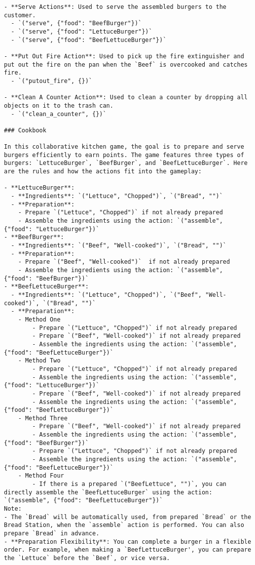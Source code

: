 \begin{lstlisting}
- **Serve Actions**: Used to serve the assembled burgers to the customer.
  - `("serve", {"food": "BeefBurger"})`
  - `("serve", {"food": "LettuceBurger"})`
  - `("serve", {"food": "BeefLettuceBurger"})`

- **Put Out Fire Action**: Used to pick up the fire extinguisher and put out the fire on the pan when the `Beef` is overcooked and catches fire.
  - `("putout_fire", {})`

- **Clean A Counter Action**: Used to clean a counter by dropping all objects on it to the trash can.
  - `("clean_a_counter", {})`

### Cookbook

In this collaborative kitchen game, the goal is to prepare and serve burgers efficiently to earn points. The game features three types of burgers: `LettuceBurger`, `BeefBurger`, and `BeefLettuceBurger`. Here are the rules and how the actions fit into the gameplay:

- **LettuceBurger**:
  - **Ingredients**: `("Lettuce", "Chopped")`, `("Bread", "")`
  - **Preparation**:
    - Prepare `("Lettuce", "Chopped")` if not already prepared
    - Assemble the ingredients using the action: `("assemble", {"food": "LettuceBurger"})`
- **BeefBurger**:
  - **Ingredients**: `("Beef", "Well-cooked")`, `("Bread", "")`
  - **Preparation**:
    - Prepare `("Beef", "Well-cooked")`  if not already prepared
    - Assemble the ingredients using the action: `("assemble", {"food": "BeefBurger"})`
- **BeefLettuceBurger**:
  - **Ingredients**: `("Lettuce", "Chopped")`, `("Beef", "Well-cooked")`, `("Bread", "")`
  - **Preparation**:
    - Method One
        - Prepare `("Lettuce", "Chopped")` if not already prepared
        - Prepare `("Beef", "Well-cooked")` if not already prepared
        - Assemble the ingredients using the action: `("assemble", {"food": "BeefLettuceBurger"})`
    - Method Two
        - Prepare `("Lettuce", "Chopped")` if not already prepared
        - Assemble the ingredients using the action: `("assemble", {"food": "LettuceBurger"})`
        - Prepare `("Beef", "Well-cooked")` if not already prepared
        - Assemble the ingredients using the action: `("assemble", {"food": "BeefLettuceBurger"})`
    - Method Three
        - Prepare `("Beef", "Well-cooked")` if not already prepared
        - Assemble the ingredients using the action: `("assemble", {"food": "BeefBurger"})`
        - Prepare `("Lettuce", "Chopped")` if not already prepared
        - Assemble the ingredients using the action: `("assemble", {"food": "BeefLettuceBurger"})`
    - Method Four
        - If there is a prepared `("BeefLettuce", "")`, you can directly assemble the `BeefLettuceBurger` using the action: `("assemble", {"food": "BeefLettuceBurger"})`
Note:
- The `Bread` will be automatically used, from prepared `Bread` or the Bread Station, when the `assemble` action is performed. You can also prepare `Bread` in advance.
- **Preparation Flexibility**: You can complete a burger in a flexible order. For example, when making a `BeefLettuceBurger', you can prepare the `Lettuce` before the `Beef`, or vice versa.



\end{lstlisting}
